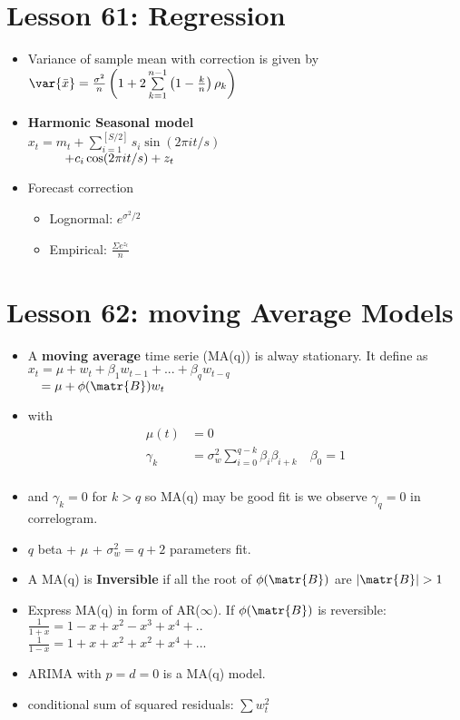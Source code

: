 \documentclass[10pt, french]{article}
\begin{document}
\begin{multicols*}{3}
\section*{Lesson 61: Regression}
\begin{itemize}[align=left,leftmargin=*]
    \item Variance of sample mean with correction is given by \\ $\var{\bar{x}} = \frac{\sigma^2}{n} \left(1 + 2\sum\limits_{k=1}^{n-1} \left(1 - \frac{k}{n}\right)\rho_k\right)$
    \item \textbf{Harmonic Seasonal model}\\
    $x_t = m_t + \sum_{i=1}^{[S/2]} s_i \sin(2\pi i t/s) $\\
    $\hspace*{1cm}+ c_i \cos(2\pi i t/s) + z_t$
    \item Forecast correction
    \begin{itemize}
       \item Lognormal: $e^{\sigma^2/2}$
       \item Empirical: $\frac{\Sigma e^{z_t}}{n}$
    \end{itemize}
\end{itemize}

\section*{Lesson 62: moving Average Models}
\begin{itemize}[align=left,leftmargin=*]
   \item A \textbf{moving average} time serie (MA(q)) is alway stationary. It define as \\
    $x_t = \mu + w_t + \beta_1 w_{t-1} + ... + \beta_q w_{t-q}$ \\
    $\hspace*{0.35cm}= \mu + \phi(\matr{B})w_t$
    \item[] with
    \begin{align*}
      \mu(t) &= 0 \\
       \gamma_k &= \sigma_w^2 \sum_{i=0}^{q-k} \beta_i \beta_{i+k}\quad \beta_0 = 1\\
    \end{align*}
    \item[] and $\gamma_k = 0$ for $k>q$ so MA(q) may be good fit is we observe $\gamma_q = 0$ in correlogram.
    \item $q$ beta + $\mu$ + $\sigma_w^2 = q+2$ parameters fit.
    \item A MA(q) is \textbf{Inversible} if all the root of
    $ \phi(\matr{B})$ are $|\matr{B}|>1$
    \item Express MA(q) in form of AR($\infty$). If $ \phi(\matr{B})$ is reversible: \\
    $\frac{1}{1+x} = 1 - x + x^2 - x^3 + x^4 + ..$\\
    $\frac{1}{1-x} = 1 + x + x^2 + x^2 + x^4 + ...$
    \item ARIMA with $p = d = 0$ is a MA(q) model.
    \item conditional sum of squared residuals: $\sum w_t^2$
\end{itemize}



\end{multicols*}
\end{document}
